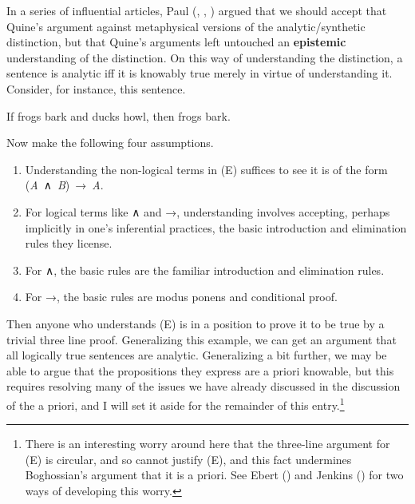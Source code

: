 \documentclass[
  11pt,
  letterpaper,
  DIV=11,
  numbers=noendperiod,
  twoside]{scrartcl}
\providecommand{\tightlist}{%
  \setlength{\itemsep}{0pt}\setlength{\parskip}{0pt}}
\begin{document}
In a series of influential articles, Paul
(,
,
) argued that we should accept
that Quine's argument against metaphysical versions of the
analytic/synthetic distinction, but that Quine's arguments left
untouched an \textbf{epistemic} understanding of the distinction. On
this way of understanding the distinction, a sentence is analytic iff it
is knowably true merely in virtue of understanding it. Consider, for
instance, this sentence.

\begin{description}
\tightlist
\item[(E)]
If frogs bark and ducks howl, then frogs bark.
\end{description}

Now make the following four assumptions.

\begin{enumerate}
\def\labelenumi{\arabic{enumi}.}
\tightlist
\item
  Understanding the non-logical terms in (E) suffices to see it is of
  the form (\emph{A}~∧~\emph{B})~→~\emph{A}.
\item
  For logical terms like ∧ and →, understanding involves accepting,
  perhaps implicitly in one's inferential practices, the basic
  introduction and elimination rules they license.
\item
  For ∧, the basic rules are the familiar introduction and elimination
  rules.
\item
  For →, the basic rules are modus ponens and conditional proof.
\end{enumerate}

Then anyone who understands (E) is in a position to prove it to be true
by a trivial three line proof. Generalizing this example, we can get an
argument that all logically true sentences are analytic. Generalizing a
bit further, we may be able to argue that the propositions they express
are a priori knowable, but this requires resolving many of the issues we
have already discussed in the discussion of the a priori, and I will set
it aside for the remainder of this entry.\footnote{There is an
  interesting worry around here that the three-line argument for (E) is
  circular, and so cannot justify (E), and this fact undermines
  Boghossian's argument that it is a priori. See Ebert
  () and Jenkins
  () for two ways of developing
  this worry.}
\end{document}

